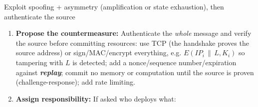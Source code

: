 \documentclass[12pt, a4paper]{article}
\newcommand{\term}[1]{\textbf{\textit{#1}}}        %
\newcommand{\imp}[1]{\hl{#1}}                       %
\begin{document}
\begin{schemebox}{Exploit spoofing + asymmetry (amplification or state exhaustion), then authenticate the source}
\begin{enumerate}[label=\textbf{Step \arabic*:}, leftmargin=*]
    \item \textbf{Propose the countermeasure:} Authenticate the \emph{whole} message and verify the source before committing resources: use TCP (the handshake proves the source address) or sign/MAC/encrypt everything, e.g. $E(IP_i \,\|\, L, K_i)$ so tampering with $L$ is detected;
    add a nonce/sequence number/expiration against \term{replay}; commit no memory or computation until the source is proven (challenge-response); add rate limiting.
    \item \textbf{Assign responsibility:} If asked who deploys what:
\end{enumerate}
\end{schemebox}
\end{document}
